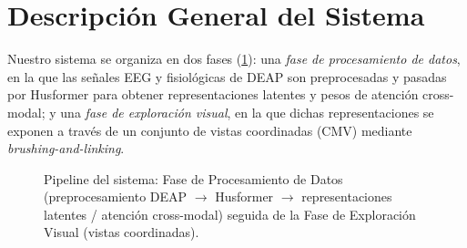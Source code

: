 \section{Descripción General del Sistema}\label{sec:overview}


Nuestro sistema se organiza en dos fases (\cref{fig:pipeline}): una \emph{fase de procesamiento de datos}, en la que las señales EEG y fisiológicas de DEAP son preprocesadas y pasadas por Husformer \cite{wang2022husformer} para obtener representaciones latentes y pesos de atención cross-modal; y una \emph{fase de exploración visual}, en la que dichas representaciones se exponen a través de un conjunto de vistas coordinadas (CMV) mediante \emph{brushing-and-linking}.

\begin{figure}
\centering
\caption{Pipeline del sistema: Fase de Procesamiento de Datos (preprocesamiento DEAP $\rightarrow$ Husformer $\rightarrow$ representaciones latentes / atención cross-modal) seguida de la Fase de Exploración Visual (vistas coordinadas).}
\label{fig:pipeline}
\end{figure}

